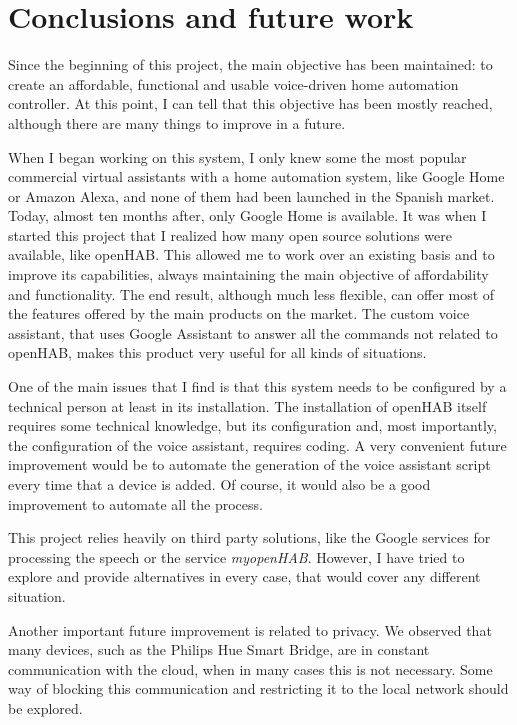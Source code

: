 \chapter{Conclusions and future work}

Since the beginning of this project, the main objective has been maintained: to create an affordable, functional and usable voice-driven 
home automation controller. At this point, I can tell that this objective has been mostly reached, although there are many things
to improve in a future.

When I began working on this system, I only knew some the most popular commercial virtual assistants with a home automation system, 
like Google Home or Amazon Alexa, and none of them had been launched in the Spanish market. Today, almost ten months after, only 
Google Home is available. It was when I started this project that I realized how many open source solutions were available, like openHAB. 
This allowed me to work over an existing basis and to improve its capabilities, always maintaining the main objective of affordability
and functionality. The end result, although much less flexible, can offer most of the features offered by the main products on the 
market. The custom voice assistant, that uses Google Assistant to answer all the commands not related to openHAB, makes this product
very useful for all kinds of situations.

One of the main issues that I find is that this system needs to be configured by a technical person at least in its installation.
The installation of openHAB itself requires some technical knowledge, but its configuration and, most importantly, the configuration
of the voice assistant, requires coding. A very convenient future improvement would be to automate the generation of the voice 
assistant script every time that a device is added. Of course, it would also be a good improvement to automate all the process.

This project relies heavily on third party solutions, like the Google services for processing the speech or the service 
\textit{myopenHAB}. However, I have tried to explore and provide alternatives in every case, that would cover any different situation.

Another important future improvement is related to privacy. We observed that many devices, such as the Philips Hue Smart Bridge,
are in constant communication with the cloud, when in many cases this is not necessary. Some way of blocking this communication 
and restricting it to the local network should be explored.

